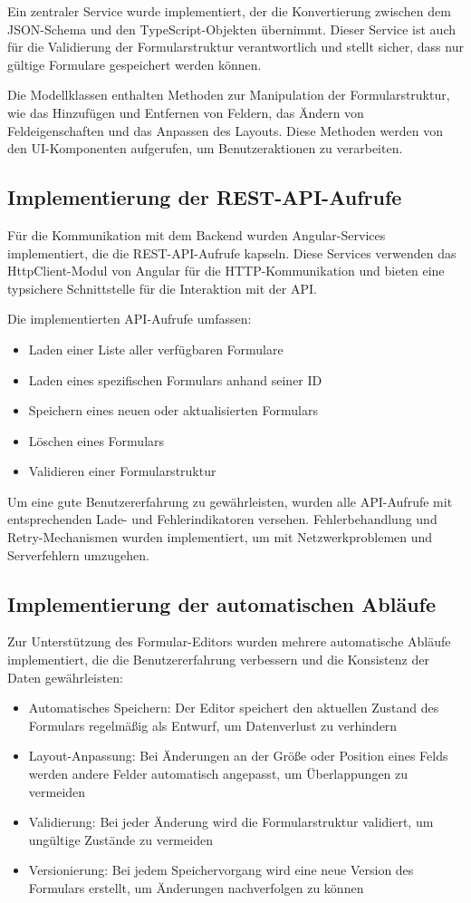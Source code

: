 \documentclass[a4paper,11pt]{article}
\begin{document}
Ein zentraler Service wurde implementiert, der die Konvertierung zwischen dem JSON-Schema und den TypeScript-Objekten übernimmt. Dieser Service ist auch für die Validierung der Formularstruktur verantwortlich und stellt sicher, dass nur gültige Formulare gespeichert werden können.

\noindent Die Modellklassen enthalten Methoden zur Manipulation der Formularstruktur, wie das Hinzufügen und Entfernen von Feldern, das Ändern von Feldeigenschaften und das Anpassen des Layouts. Diese Methoden werden von den UI-Komponenten aufgerufen, um Benutzeraktionen zu verarbeiten.

\subsection{Implementierung der REST-API-Aufrufe}
Für die Kommunikation mit dem Backend wurden Angular-Services implementiert, die die REST-API-Aufrufe kapseln. Diese Services verwenden das HttpClient-Modul von Angular für die HTTP-Kommunikation und bieten eine typsichere Schnittstelle für die Interaktion mit der API.

Die implementierten API-Aufrufe umfassen:
\begin{itemize}
  \item Laden einer Liste aller verfügbaren Formulare
  \item Laden eines spezifischen Formulars anhand seiner ID
  \item Speichern eines neuen oder aktualisierten Formulars
  \item Löschen eines Formulars
  \item Validieren einer Formularstruktur
\end{itemize}

Um eine gute Benutzererfahrung zu gewährleisten, wurden alle API-Aufrufe mit entsprechenden Lade- und Fehlerindikatoren versehen. Fehlerbehandlung und Retry-Mechanismen wurden implementiert, um mit Netzwerkproblemen und Serverfehlern umzugehen.

\subsection{Implementierung der automatischen Abläufe}
Zur Unterstützung des Formular-Editors wurden mehrere automatische Abläufe implementiert, die die Benutzererfahrung verbessern und die Konsistenz der Daten gewährleisten:

\begin{itemize}
  \item Automatisches Speichern: Der Editor speichert den aktuellen Zustand des Formulars regelmäßig als Entwurf, um Datenverlust zu verhindern
  \item Layout-Anpassung: Bei Änderungen an der Größe oder Position eines Felds werden andere Felder automatisch angepasst, um Überlappungen zu vermeiden
  \item Validierung: Bei jeder Änderung wird die Formularstruktur validiert, um ungültige Zustände zu vermeiden
  \item Versionierung: Bei jedem Speichervorgang wird eine neue Version des Formulars erstellt, um Änderungen nachverfolgen zu können
\end{itemize}
\end{document}
